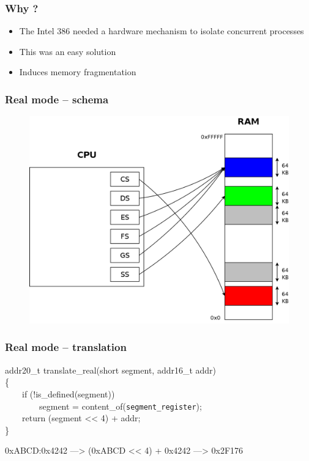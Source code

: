 \documentclass{beamer}
\begin{document}
\begin{frame}
  \frametitle{Why ?}

  \begin{itemize}
  \item
    The Intel 386 needed a hardware mechanism to isolate concurrent processes
  \item
    This was an easy solution
  \item
    Induces memory fragmentation
  \end{itemize}
\end{frame}

\begin{frame}
  \frametitle{Real mode -- schema}

  \begin{figure}
  \includegraphics[scale=0.16]{real.png}
  \end{figure}
\end{frame}

\begin{frame}
  \frametitle{Real mode -- translation}

  addr20\_t translate\_real(short segment, addr16\_t addr)\\
 \{\\
  \ \ \ \ if (!is\_defined(segment))\\
  \ \ \ \ \ \ \ \ segment = content\_of(\texttt{segment\_register});\\
  \ \ \ \ return (segment << 4) + addr;\\
 \}\\

  \vspace{10pt}

  0xABCD:0x4242 ---> (0xABCD << 4) + 0x4242 ---> 0x2F176
\end{frame}
\end{document}
